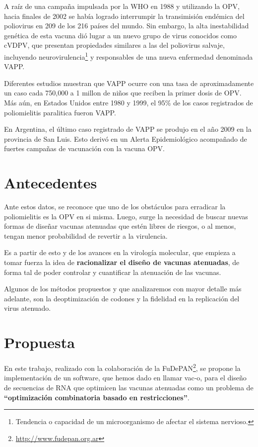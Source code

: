 A ra\'iz de una campa\~na impulsada por la \ac{WHO} en 1988 y utilizando la
\ac{OPV}, hacia finales de 2002 se hab\'ia logrado interrumpir la
transimisi\'on end\'emica del poliovirus en 209 de los 216 pa\'ises del
mundo\cite{Aylward04}. Sin embargo, la alta inestabilidad gen\'etica de esta
vacuna di\'o lugar a un nuevo grupo de virus conocidos como \ac{cVDPV}, que
presentan propiedades similares a las del poliovirus salvaje, incluyendo
neurovirulencia\footnote{Tendencia o capacidad de un microorganismo de afectar
el sistema nervioso.} y responsables de una nueva enfermedad denominada
\ac{VAPP}. 

Diferentes estudios muestran que \ac{VAPP} ocurre con una tasa de
aproximadamente un caso cada 750,000 a 1 millon de ni\~nos que reciben la
primer dosis de \ac{OPV}\cite{Aylward04}. M\'as a\'un, en Estados Unidos entre
1980 y 1999, el 95\% de los casos registrados de poliomielitis paralitica fueron
\ac{VAPP}\cite{DeJesus07}.

En Argentina, el \'ultimo caso registrado de \ac{VAPP} se produjo en el a\~no
2009 en la provincia de San Luis\cite{msal09}. Esto deriv\'o en un Alerta
Epidemiol\'ogico acompa\~nado de fuertes campa\~nas de vacunaci\'on con la
vacuna \ac{OPV}.

\section{Antecedentes}
\label{antecedentes}
Ante estos datos, se reconoce que uno de los obst\'aculos para erradicar la
poliomielitis es la \ac{OPV} en si misma\cite{Chumakov08}. Luego, surge la
necesidad de buscar nuevas formas de dise\~nar vacunas atenuadas que est\'en
libres de riesgos, o al menos, tengan menor probabilidad de revertir a la
virulencia.

Es a partir de esto y de los avances en la virolog\'ia molecular, que empieza
a tomar fuerza la idea de \textbf{racionalizar el dise\~no de vacunas
atenuadas}, de forma tal de poder controlar y cuantificar la atenuaci\'on de las
vacunas\cite{Lauring10}.

Algunos de los m\'etodos propuestos y que analizaremos con mayor detalle m\'as
adelante, son la deoptimizaci\'on  de codones\cite{Coleman08} y la fidelidad en
la replicaci\'on del virus atenuado\cite{Vignuzzi08}.

\section{Propuesta}
\label{propuesta}
En este trabajo, realizado con la colaboraci\'on de la
\ac{FuDePAN}\footnote{\url{http://www.fudepan.org.ar}}, se propone la
implementaci\'on de un software, que hemos dado en llamar \ac{vac-o}, para el
dise\~no de secuencias de \ac{RNA} que optimicen las vacunas atenuadas como un
problema de \textbf{``optimizaci\'on combinatoria basado en restricciones''}. 

